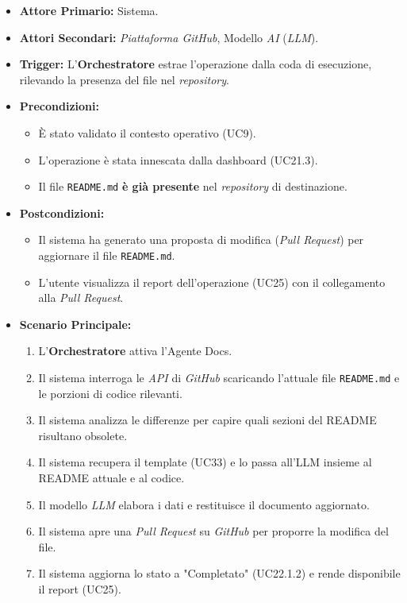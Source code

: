 \documentclass[12pt, a4paper]{article}
\begin{document}
\begin{itemize}
    \item \textbf{Attore Primario:} Sistema.
    \item \textbf{Attori Secondari:} \textit{Piattaforma GitHub}, Modello \textit{AI} (\textit{LLM}).
    \item \textbf{Trigger:} L'\textbf{Orchestratore} estrae l'operazione dalla coda di esecuzione, rilevando la presenza del file nel \textit{repository}.
    \item \textbf{Precondizioni:}
    \begin{itemize}
        \item È stato validato il contesto operativo (UC9).
        \item L'operazione è stata innescata dalla dashboard (UC21.3).
        \item Il file \texttt{README.md} \textbf{è già presente} nel \textit{repository} di destinazione.
    \end{itemize}\newpage
    \item \textbf{Postcondizioni:}
    \begin{itemize}
        \item Il sistema ha generato una proposta di modifica (\textit{Pull Request}) per aggiornare il file \texttt{README.md}.
        \item L'utente visualizza il report dell'operazione (UC25) con il collegamento alla \textit{Pull Request}.
    \end{itemize}
    \item \textbf{Scenario Principale:}
    \begin{enumerate}
        \item L'\textbf{Orchestratore} attiva l'Agente Docs.
        \item Il sistema interroga le \textit{API} di \textit{GitHub} scaricando l'attuale file \texttt{README.md} e le porzioni di codice rilevanti.
        \item Il sistema analizza le differenze per capire quali sezioni del README risultano obsolete.
        \item Il sistema recupera il template (UC33) e lo passa all'LLM insieme al README attuale e al codice.
        \item Il modello \textit{LLM} elabora i dati e restituisce il documento aggiornato.
        \item Il sistema apre una \textit{Pull Request} su \textit{GitHub} per proporre la modifica del file.
        \item Il sistema aggiorna lo stato a "Completato" (UC22.1.2) e rende disponibile il report (UC25).

\end{enumerate}
\end{itemize}
\end{document}
